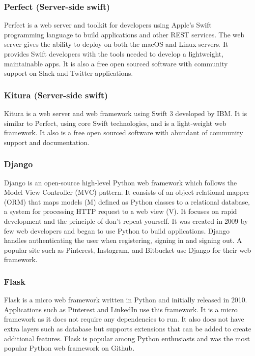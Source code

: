 \subsubsection{Perfect (Server-side swift)}
Perfect \cite{perfect} is a web server and toolkit for developers using Apple's Swift programming language to build applications and other REST services.  The web server gives the ability to deploy on both the macOS and Linux servers. It provides Swift developers with the tools needed to develop a lightweight, maintainable apps. It is also a free open sourced software with community support on Slack and Twitter applications.

\subsubsection{Kitura (Server-side swift)}
Kitura \cite{kitura} is a web server and web framework using Swift 3 developed by IBM. It is similar to Perfect, using core Swift technologies, and is a light-weight web framework. It also is a free open sourced software with abundant of community support and documentation.

\subsubsection{Django}
Django \cite{django} is an open-source high-level Python web framework which follows the Model-View-Controller (MVC) pattern. It consists of an object-relational mapper (ORM) that maps models (M) defined as Python classes to a relational database, a system for processing HTTP request to a web view (V). It focuses on rapid development and the principle of don't repeat yourself. It was created in 2009 by few web developers and began to use Python to build applications. Django handles authenticating the user when registering, signing in and signing out. A popular site such as Pinterest, Instagram, and Bitbucket use Django for their web framework.

\subsubsection{Flask}
Flask \cite{flask} is a micro web framework written in Python and initially released in 2010. Applications such as Pinterest and LinkedIn use this framework. It is a micro framework as it does not require any dependencies to run. It also does not have extra layers such as database but supports extensions that can be added to create additional features. Flask is popular among Python enthusiasts and was the most popular Python web framework on Github.

